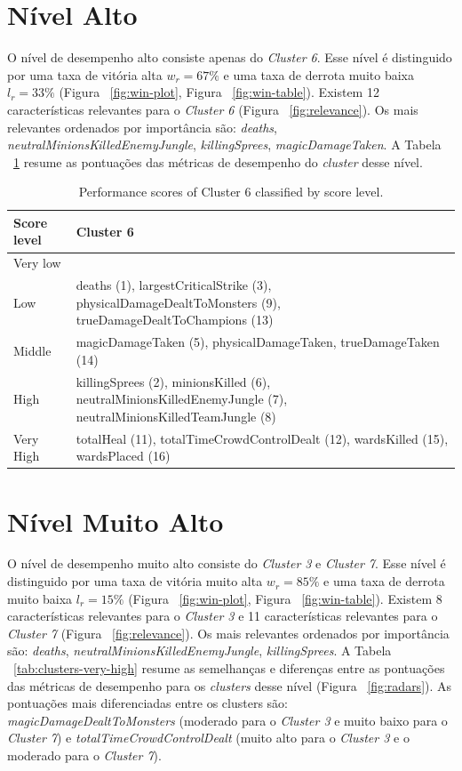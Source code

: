 \section{Nível Alto}
O nível de desempenho alto consiste apenas do \textit{Cluster 6}. Esse nível é distinguido por uma taxa de vitória alta $w_r = 67 \%$ e uma taxa de derrota muito baixa $l_r = 33 \%$ (Figura ~\ref{fig:win-plot}, Figura ~\ref{fig:win-table}). Existem 12 características relevantes para o \textit{Cluster 6} (Figura ~\ref{fig:relevance}). Os mais relevantes ordenados por importância são: \textit{deaths}, \textit{neutralMinionsKilledEnemyJungle}, \textit{killingSprees}, \textit{magicDamageTaken}. A Tabela ~\ref{tab:clusters-high} resume as pontuações das métricas de desempenho do \textit{cluster} desse nível.

\begin{table}
  \tiny
  \caption{Performance scores of Cluster 6 classified by score level.}
  \label{tab:clusters-high}
  \begin{tabular}{p{}p{}}
    \toprule
    Score level & Cluster 6 \\
    \midrule
Very low &  \\
    \hline
Low & deaths (1), largestCriticalStrike (3), physicalDamageDealtToMonsters (9), trueDamageDealtToChampions (13) \\
    \hline
Middle & magicDamageTaken (5), physicalDamageTaken, trueDamageTaken (14)  \\
    \hline
High & killingSprees (2), minionsKilled (6), neutralMinionsKilledEnemyJungle (7), neutralMinionsKilledTeamJungle (8) \\
    \hline
Very High & totalHeal (11), totalTimeCrowdControlDealt (12), wardsKilled (15), wardsPlaced (16) \\ 
  \bottomrule
\end{tabular}
\end{table}

\section{Nível Muito Alto}
O nível de desempenho muito alto consiste do \textit{Cluster 3} e \textit{Cluster 7}. Esse nível é distinguido por uma taxa de vitória muito alta $w_r = 85\% $ e uma taxa de derrota muito baixa $l_r = 15\% $ (Figura ~\ref{fig:win-plot}, Figura ~\ref{fig:win-table}). Existem 8 características relevantes para o \textit{Cluster 3} e 11 características relevantes para o \textit{Cluster 7} (Figura ~\ref{fig:relevance}). Os mais relevantes ordenados por importância são: \textit{deaths}, \textit{neutralMinionsKilledEnemyJungle}, \textit{killingSprees}. A Tabela ~\ref{tab:clusters-very-high} resume as semelhanças e diferenças entre as pontuações das métricas de desempenho para os \textit{clusters} desse nível (Figura ~\ref{fig:radars}). As pontuações mais diferenciadas entre os clusters são: \textit{magicDamageDealtToMonsters} (moderado para o \textit{Cluster 3} e muito baixo para o \textit{Cluster 7}) e \textit{totalTimeCrowdControlDealt} (muito alto para o \textit{Cluster 3} e o moderado para o \textit{Cluster 7}).

